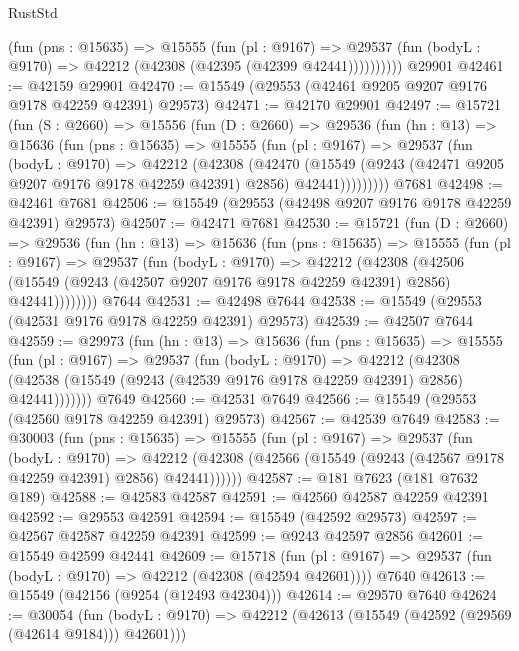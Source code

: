 \begin{lexlean}{RustStd}
\begin{coremodule}
            (fun (pns : @15635) =>
            @15555
              (fun (pl : @9167) =>
              @29537 (fun (bodyL : @9170) => @42212 (@42308 (@42395 (@42399 @42441))))))))))
    @29901
@42461 := @42159 @29901
@42470 := @15549 (@29553 (@42461 @9205 @9207 @9176 @9178 @42259 @42391) @29573)
@42471 := @42170 @29901
@42497 := @15721
    (fun (S : @2660) =>
    @15556
      (fun (D : @2660) =>
      @29536
        (fun (hn : @13) =>
        @15636
          (fun (pns : @15635) =>
          @15555
            (fun (pl : @9167) =>
            @29537
              (fun (bodyL : @9170) =>
              @42212
                (@42308
                  (@42470
                    (@15549
                      (@9243 (@42471 @9205 @9207 @9176 @9178 @42259 @42391) @2856)
                      @42441)))))))))
    @7681
@42498 := @42461 @7681
@42506 := @15549 (@29553 (@42498 @9207 @9176 @9178 @42259 @42391) @29573)
@42507 := @42471 @7681
@42530 := @15721
    (fun (D : @2660) =>
    @29536
      (fun (hn : @13) =>
      @15636
        (fun (pns : @15635) =>
        @15555
          (fun (pl : @9167) =>
          @29537
            (fun (bodyL : @9170) =>
            @42212
              (@42308
                (@42506
                  (@15549 (@9243 (@42507 @9207 @9176 @9178 @42259 @42391) @2856) @42441))))))))
    @7644
@42531 := @42498 @7644
@42538 := @15549 (@29553 (@42531 @9176 @9178 @42259 @42391) @29573)
@42539 := @42507 @7644
@42559 := @29973
    (fun (hn : @13) =>
    @15636
      (fun (pns : @15635) =>
      @15555
        (fun (pl : @9167) =>
        @29537
          (fun (bodyL : @9170) =>
          @42212
            (@42308 (@42538 (@15549 (@9243 (@42539 @9176 @9178 @42259 @42391) @2856) @42441)))))))
    @7649
@42560 := @42531 @7649
@42566 := @15549 (@29553 (@42560 @9178 @42259 @42391) @29573)
@42567 := @42539 @7649
@42583 := @30003
    (fun (pns : @15635) =>
    @15555
      (fun (pl : @9167) =>
      @29537
        (fun (bodyL : @9170) =>
        @42212 (@42308 (@42566 (@15549 (@9243 (@42567 @9178 @42259 @42391) @2856) @42441))))))
@42587 := @181 @7623 (@181 @7632 @189)
@42588 := @42583 @42587
@42591 := @42560 @42587 @42259 @42391
@42592 := @29553 @42591
@42594 := @15549 (@42592 @29573)
@42597 := @42567 @42587 @42259 @42391
@42599 := @9243 @42597 @2856
@42601 := @15549 @42599 @42441
@42609 := @15718
    (fun (pl : @9167) => @29537 (fun (bodyL : @9170) => @42212 (@42308 (@42594 @42601))))
    @7640
@42613 := @15549 (@42156 (@9254 (@12493 @42304)))
@42614 := @29570 @7640
@42624 := @30054
    (fun (bodyL : @9170) => @42212 (@42613 (@15549 (@42592 (@29569 (@42614 @9184))) @42601)))

\end{coremodule}
\end{lexlean}
